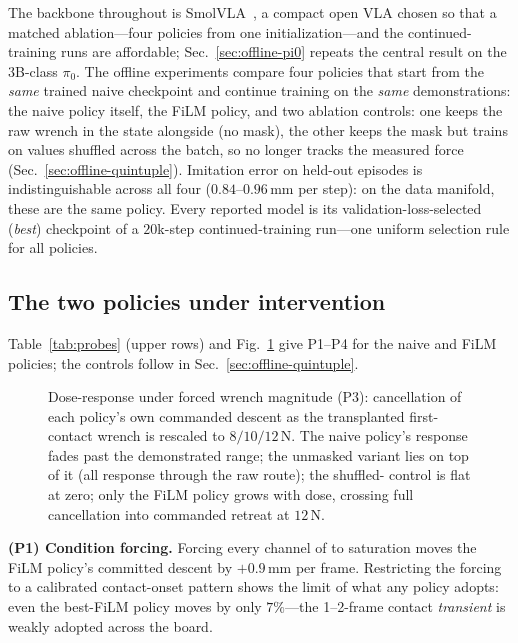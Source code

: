 The backbone throughout is SmolVLA~\cite{smolvla}, a compact open VLA chosen so that a matched
ablation---four policies from one initialization---and the continued-training runs are
affordable; Sec.~\ref{sec:offline-pi0} repeats the central result on the $3$B-class $\pi_0$.
The offline experiments compare four policies that start from the \emph{same} trained naive
checkpoint and continue training on the \emph{same} demonstrations: the naive policy itself,
the FiLM policy, and two ablation controls:
one keeps the raw wrench in the state alongside \chat{} (no mask), the other keeps the mask but
trains on \chat{} values shuffled across the batch, so \chat{} no longer tracks the measured
force (Sec.~\ref{sec:offline-quintuple}). Imitation error on
held-out episodes is indistinguishable across all four ($0.84$--$0.96$\,mm per step): on the
data manifold, these are the same policy. Every reported model is its validation-loss-selected
(\emph{best}) checkpoint of a $20$k-step continued-training run---one uniform selection rule
for all policies.

\subsection{The two policies under intervention}
\label{sec:offline-main}

Table~\ref{tab:probes} (upper rows) and Fig.~\ref{fig:doseresponse} give P1--P4 for the naive
and FiLM policies; the controls follow in Sec.~\ref{sec:offline-quintuple}.

\begin{figure}[t]
\centering

\caption{Dose-response under forced wrench magnitude (P3): cancellation of each policy's
own commanded descent as the transplanted first-contact wrench is rescaled to
$8/10/12$\,N. The naive policy's response fades past the demonstrated range; the unmasked
variant lies on top of it (all response through the raw route); the shuffled-\chat{} control is
flat at zero; only the FiLM policy grows with dose, crossing full cancellation into
commanded retreat at $12$\,N.}
\label{fig:doseresponse}
\end{figure}

\textbf{(P1) Condition forcing.} Forcing every channel of \chat{} to saturation moves the
FiLM policy's committed descent by $+0.9$\,mm per frame. Restricting the forcing to a
calibrated contact-onset pattern shows the limit of what any policy adopts: even the
best-FiLM policy moves by only $7\%$---the 1--2-frame contact \emph{transient} is
weakly adopted across the board.

